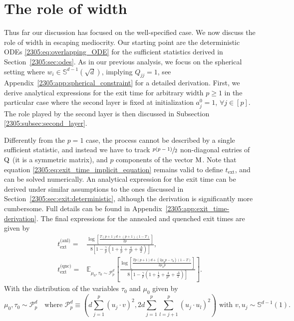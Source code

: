 \section{The role of width}

\label{2305:sec:width}
Thus far our discussion has focused on the well-specified case. We now discuss the role of width in escaping mediocrity. Our starting point are the deterministic ODEs \eqref{2305:eq:overlapping_ODE} for the sufficient statistics derived in Section~\ref{2305:sec:odes}. As in our previous analysis, we focus on the spherical setting where $w_{i}\in\mathbb{S}^{d-1}(\sqrt{d})$, implying $Q_{jj}=1$, see Appendix~\ref{2305:app:spherical_constraint} for a detailed derivation. First, we derive analytical expressions for the exit time for arbitrary width $p\geq 1$ in the particular case where the second layer is fixed at initialization $a^{0}_{j}=1$, $\forall j\in[p]$. The role played by the second layer is then discussed in Subsection \ref{2305:subsec:second_layer}.

Differently from the $p=1$ case, the process cannot be described by a single sufficient statistic, and instead we have to track \(\sfrac{p(p-1)}{2}\) non-diagonal entries of \(\mathrm{Q}\) (it is a symmetric matrix), and \(p\) components of the vector \(\mathrm{M}\). Note that equation \eqref{2305:eq:exit_time_implicit_equation} remains valid to define \(t_\text{ext}\), and can be solved numerically. An analytical expression for the exit time can be derived under similar assumptions to the ones discussed in Section~\ref{2305:sec:exit:deterministic}, although the derivation is significantly more cumbersome. Full details can be found in Appendix~\ref{2305:app:exit_time-derivation}. The final expressions for the annealed and quenched exit times are given by
\begin{align}
    \label{2305:eq:exit_time:p_annealed}
    t_\text{ext}^\text{(anl)} =& \frac{\log\left[\frac{T(p+1)d+(p+1)(1-T)}{2 p}\right]}{8\left[
      1 -\frac{\gamma}{p} \left(1 +\frac{1}{p} + \frac{4}{p^2} + \frac\Delta2 \right)
    \right]}, \\
    \label{2305:eq:exit_time:p_quenched}
    t_\text{ext}^\text{(qnc)} =& \mathbb E_{\mu_0,\tau_0 \sim \mathcal{P}^d_p} \left[
        \frac{\log\left[\frac{Tp(p+1)d+(2\mu_0p-\tau_0)(1-T)}{2\mu_0 p}\right]}{8\left[
      1 -\frac{\gamma}{p} \left(1 +\frac{1}{p} + \frac{4}{p^2} + \frac\Delta2 \right)
    \right]}
    \right].
\end{align}
With the distribution of the variables \(\tau_0\) and \(\mu_0\) given by
\[
    \mu_0,\tau_0 \sim \mathcal{P}^d_p \quad\text{where }
    \mathcal{P}^d_p \equiv \left(d\sum_{j=1}^{p}(u_j\cdot v)^2, 2d\sum_{j=1}^{p}\sum_{l=j+1}^{p}(u_j\cdot u_l)^2\right)\text{ with } v,u_j\sim\mathbb S^{d-1}(1).
\]



